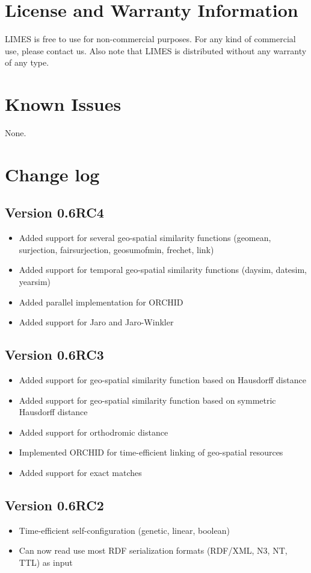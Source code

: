 \documentclass[a4paper, 11pt]{article}
\begin{document}
\section{License and Warranty Information}
LIMES is free to use for non-commercial purposes.
For any kind of commercial use, please contact us.
Also note that LIMES is distributed without any warranty of any type.

\section{Known Issues}

None.

\section{Change log}
\subsection{Version 0.6RC4}
\begin{itemize}
\item Added support for several geo-spatial similarity functions (geomean, surjection, fairsurjection, geosumofmin, frechet, link)
\item Added support for temporal geo-spatial similarity functions (daysim, datesim, yearsim)
\item Added parallel implementation for ORCHID
\item Added support for Jaro and Jaro-Winkler
\end{itemize}

\subsection{Version 0.6RC3}
\begin{itemize}
\item Added support for geo-spatial similarity function based on Hausdorff distance
\item Added support for geo-spatial similarity function based on symmetric Hausdorff distance
\item Added support for orthodromic distance
\item Implemented ORCHID for time-efficient linking of geo-spatial resources
\item Added support for exact matches
\end{itemize}


\subsection{Version 0.6RC2}
\begin{itemize}
\item Time-efficient self-configuration (genetic, linear, boolean)
\item Can now read use most RDF serialization formats (RDF/XML, N3, NT, TTL) as input
\end{itemize}
\end{document}
